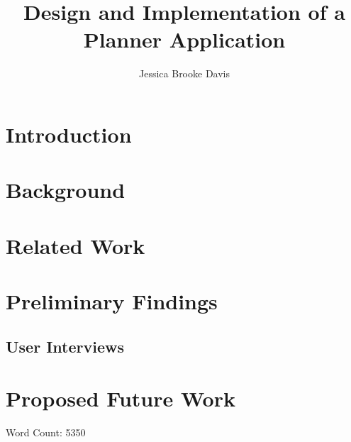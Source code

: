 \documentclass[12pt]{asu}
\title{Design and Implementation of a Planner Application}
\author{Jessica Brooke Davis}
\begin{document}
	\begin{preliminary}
		\maketitle
		\makecopyright
		
		\tableofcontents
		
	\end{preliminary}
	
	
	
	\chapter{Introduction}
	 \label{intro}
	
	\chapter{Background} 
	 \label{bkgrnd}
	
	\chapter{Related Work} \label{relwork}
	 \label{relwork_intro}
	
	\chapter{Preliminary Findings}
	 \label{prelim}
	\section{User Interviews}
	 \label{ui}
	
	\chapter{Proposed Future Work}
	 \label{future}
	
	\newpage

        
        
	
	Word Count: 5350
	
	\appendix
	\fontsize{11pt}{26pt}\selectfont


	\newpage
\end{document}
